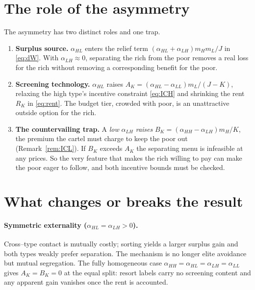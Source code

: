 \documentclass[11pt]{article}
\theoremstyle{plain}
\theoremstyle{definition}
\theoremstyle{remark}
\newcommand{\mH}{m_{H}}
\newcommand{\mL}{m_{L}}
\newcommand{\aHH}{\alpha_{HH}}
\newcommand{\aHL}{\alpha_{HL}}
\newcommand{\aLH}{\alpha_{LH}}
\newcommand{\aLL}{\alpha_{LL}}
\begin{document}
\section{The role of the asymmetry}\label{sec:role}

The asymmetry has two distinct roles and one trap.
\begin{enumerate}[label=(\alph*),leftmargin=2.2em]
\item \textbf{Surplus source.} $\aHL$ enters the relief term $(\aHL+\aLH)\mH\mL/J$ in
\eqref{eq:dW}. With $\aLH\approx0$, separating the rich from the poor removes a real loss for
the rich without removing a corresponding benefit for the poor.
\item \textbf{Screening technology.} $\aHL$ raises $A_K=(\aHL-\aLL)\mL/(J-K)$, relaxing the high
type's incentive constraint \eqref{eq:ICH} and shrinking the rent $R_K$ in \eqref{eq:rent}. The
budget tier, crowded with poor, is an unattractive outside option for the rich.
\item \textbf{The countervailing trap.} A \emph{low} $\aLH$ \emph{raises}
$B_K=(\aHH-\aLH)\mH/K$, the premium the cartel must charge to keep the poor out
(Remark~\ref{rem:ICL}). If $B_K$ exceeds $A_K$ the separating menu is infeasible at any prices.
So the very feature that makes the rich willing to pay can make the poor eager to follow, and
both incentive bounds must be checked.
\end{enumerate}

\section{What changes or breaks the result}\label{sec:discussion}

\paragraph{Symmetric externality ($\aHL=\aLH>0$).}
Cross--type contact is mutually costly; sorting yields a larger surplus gain and both types
weakly prefer separation. The mechanism is no longer elite avoidance but mutual segregation.
The fully homogeneous case $\aHH=\aHL=\aLH=\aLL$ gives $A_K=B_K=0$ at the equal split: resort
labels carry no screening content and any apparent gain vanishes once the rent is accounted.
\end{document}
